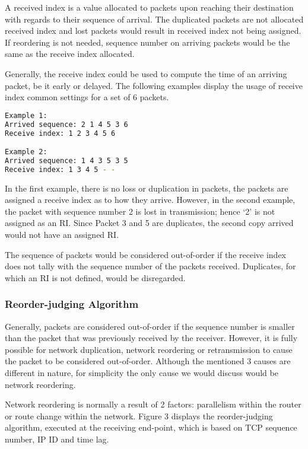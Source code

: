 \documentclass[letterpaper,twocolumn,10pt]{article}
\begin{document}
A received index is a value allocated to packets upon reaching their destination with regards to their sequence of arrival. The duplicated packets are not allocated received index and lost packets would result in received index not being assigned. If reordering is not needed, sequence number on arriving packets would be the same as the receive index allocated.

Generally, the receive index could be used to compute the time of an arriving packet, be it early or delayed.
The following examples display the usage of receive index common settings for a set of 6 packets.


\begin{lstlisting}[language=bash, frame=none]
Example 1:
Arrived sequence: 2 1 4 5 3 6
Receive index: 1 2 3 4 5 6

Example 2:
Arrived sequence: 1 4 3 5 3 5
Receive index: 1 3 4 5 - -
\end{lstlisting}

In the first example, there is no loss or duplication in packets, the packets are assigned a receive index as to how they arrive. However, in the second example, the packet with sequence number 2 is lost in transmission; hence ‘2’ is not assigned as an RI. Since Packet 3 and 5 are duplicates, the second copy arrived would not have an assigned RI.

The sequence of packets would be considered out-of-order if the receive index does not tally with the sequence number of the packets received. Duplicates, for which an RI is not defined, would be disregarded\cite{improvedpacket}.

\subsubsection{Reorder-judging Algorithm}

Generally, packets are considered out-of-order if the sequence number is smaller than the packet that was previously received by the receiver.  However, it is fully possible for network duplication, network reordering or retransmission to cause the packet to be considered out-of-order. Although the mentioned 3 causes are different in nature, for simplicity the only cause we would discuss would be network reordering.

Network reordering is normally a result of 2 factors: parallelism within the router or route change within the network\cite{packetreordering}. Figure 3 displays the reorder-judging algorithm, executed at the receiving end-point, which is based on TCP sequence number, IP ID and time lag.
\end{document}
